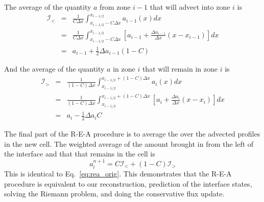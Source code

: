 The average of the quantity $a$ from zone $i-1$ that will advect into
zone $i$ is 
\begin{eqnarray}
\mathcal{I}_< &=& \frac{1}{C \Delta x} 
   \int_{x_{i-1/2} - C\Delta x}^{x_{i-1/2}} a_{i-1}(x) dx \\
%
 &=& \frac{1}{C \Delta x} 
   \int_{x_{i-1/2} - C\Delta x}^{x_{i-1/2}}
        \left [ a_{i-1} + \frac{\Delta a_{i-1}}{\Delta x} (x - x_{i-1} ) \right ] dx  \\
 &=& a_{i-1} + \frac{1}{2} \Delta a_{i-1} (1-C)
\end{eqnarray}

And the average of the quantity $a$ in zone $i$ that will remain in zone $i$
is
\begin{eqnarray}
\mathcal{I}_> &=& \frac{1}{(1-C) \Delta x} 
   \int_{x_{i-1/2}}^{x_{i-1/2} + (1-C) \Delta x} a_{i}(x) dx \\
%
 &=& \frac{1}{(1-C) \Delta x} 
   \int_{x_{i-1/2}}^{x_{i-1/2} + (1-C)\Delta x} 
        \left [ a_{i} + \frac{\Delta a_{i}}{\Delta x} (x - x_{i} ) \right ] dx  \\
 &=& a_{i} - \frac{1}{2} \Delta a_{i} C
\end{eqnarray}

The final part of the R-E-A procedure is to average the over the 
advected profiles in the new cell.  The weighted average of the
amount brought in from the left of the interface and that that remains
in the cell is
\begin{equation}
a_i^{n+1} = C \mathcal{I}_< + (1 - C) \mathcal{I}_> 
\end{equation}          
This is identical to Eq.~\ref{eq:rea_orig}.  This demonstrates that the
R-E-A procedure is equivalent to our reconstruction, prediction of the
interface states, solving the Riemann problem, and doing the 
conservative flux update.

